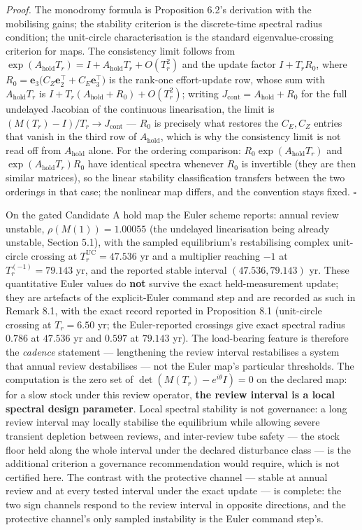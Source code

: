 \documentclass[11pt]{article}
\begin{document}
\emph{Proof.} The monodromy formula is Proposition 6.2's derivation with
the mobilising gains; the stability criterion is the discrete-time
spectral radius condition; the unit-circle characterisation is the
standard eigenvalue-crossing criterion for maps. The consistency limit
follows from
\(\exp(A_{\mathrm{hold}}T_r) = I + A_{\mathrm{hold}}T_r + O(T_r^2)\) and
the update factor \(I + T_r R_0\), where
\(R_0 = \mathbf e_3\bigl(C_Z \mathbf e_2^\top + C_E \mathbf e_3^\top\bigr)\)
is the rank-one effort-update row, whose sum with
\(A_{\mathrm{hold}}T_r\) is
\(I + T_r(A_{\mathrm{hold}} + R_0) + O(T_r^2)\); writing
\(J_{\mathrm{cont}} = A_{\mathrm{hold}} + R_0\) for the full undelayed
Jacobian of the continuous linearisation, the limit is
\((M(T_r) - I)/T_r \to J_{\mathrm{cont}}\) --- \(R_0\) is precisely what
restores the \(C_E, C_Z\) entries that vanish in the third row of
\(A_{\mathrm{hold}}\), which is why the consistency limit is not read
off from \(A_{\mathrm{hold}}\) alone. For the ordering comparison:
\(R_0 \exp(A_{\mathrm{hold}}T_r)\) and
\(\exp(A_{\mathrm{hold}}T_r) R_0\) have identical spectra whenever
\(R_0\) is invertible (they are then similar matrices), so the linear
stability classification transfers between the two orderings in that
case; the nonlinear map differs, and the convention stays fixed. \ensuremath{\square}

On the gated Candidate A hold map the Euler scheme reports: annual
review unstable, \(\rho(M(1)) = 1.00055\) (the undelayed linearisation
being already unstable, Section 5.1), with the sampled equilibrium's
restabilising complex unit-circle crossing at
\(T_r^{\mathrm{UC}} = 47.536\) yr and a multiplier reaching \(-1\) at
\(T_r^{(-1)} = 79.143\) yr, and the reported stable interval
\((47.536, 79.143)\) yr. These quantitative Euler values do \textbf{not}
survive the exact held-measurement update; they are artefacts of the
explicit-Euler command step and are recorded as such in Remark 8.1, with
the exact record reported in Proposition 8.1 (unit-circle crossing at
\(T_r = 6.50\) yr; the Euler-reported crossings give exact spectral
radius \(0.786\) at \(47.536\) yr and \(0.597\) at \(79.143\) yr). The
load-bearing feature is therefore the \emph{cadence} statement ---
lengthening the review interval restabilises a system that annual review
destabilises --- not the Euler map's particular thresholds. The
computation is the zero set of \(\det(M(T_r) - e^{i\theta}I) = 0\) on
the declared map: for a slow stock under this review operator,
\textbf{the review interval is a local spectral design parameter}. Local
spectral stability is not governance: a long review interval may locally
stabilise the equilibrium while allowing severe transient depletion
between reviews, and inter-review tube safety --- the stock floor held
along the whole interval under the declared disturbance class --- is the
additional criterion a governance recommendation would require, which is
not certified here. The contrast with the protective channel --- stable
at annual review and at every tested interval under the exact update ---
is complete: the two sign channels respond to the review interval in
opposite directions, and the protective channel's only sampled
instability is the Euler command step's.
\end{document}
